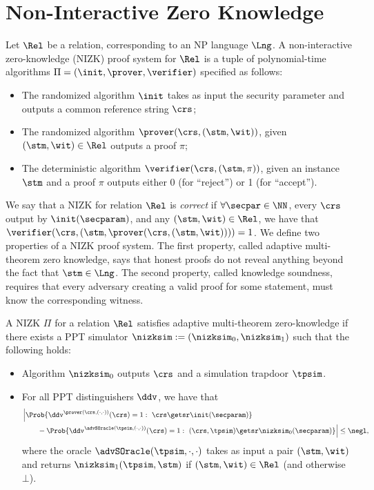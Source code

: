 \section{Non-Interactive Zero Knowledge}
Let $\Rel$ be a relation, corresponding to an NP language $\Lng$.
A non-interactive zero-knowledge (NIZK) proof system for $\Rel$
is a tuple of polynomial-time algorithms $\Pi = (\init, \prover, \verifier)$ specified as follows:
\begin{itemize}
    \item The randomized algorithm $\init$ takes as input the security parameter and outputs a common reference string $\crs$;
    \item The randomized algorithm $\prover(\crs,(\stm,\wit))$, given $(\stm,\wit) \in \Rel$ outputs a proof $\pi$;
    \item The deterministic algorithm $\verifier(\crs,(\stm,\pi))$, given an instance $\stm$ and a proof $\pi$ outputs either 0 (for ``reject'') or 1 (for ``accept'').
\end{itemize}
We say that a NIZK for relation $\Rel$ is {\em correct} if $\forall \secpar\in\NN$, every $\crs$ output by $\init(\secparam)$, and any $(\stm,\wit) \in \Rel$, we have that $\verifier(\crs,(\stm, \prover(\crs, (\stm,\wit))))=1$.
\newline\newline
We define two properties of a NIZK proof system.
The first property, called adaptive multi-theorem zero knowledge, says that honest proofs do not reveal anything beyond the fact that $\stm\in\Lng$.
The second property, called
knowledge soundness, requires that every adversary creating a valid proof for some statement, must know the corresponding witness.

\begin{definition}\label{def:nizk_zk}
    A NIZK $\Pi$ for a relation $\Rel$ satisfies adaptive multi-theorem zero-knowledge
    if there exists a PPT simulator $\nizksim := (\nizksim_0,\nizksim_1)$ such that the following holds:
    \begin{itemize}
        \item
              Algorithm $\nizksim_0$ outputs $\crs$ and a simulation trapdoor $\tpsim$.
        \item
              For all PPT distinguishers $\ddv$, we have that
              \begin{align*}
                   & \Big\lvert
                  \Prob{\ddv^{\prover(\crs,(\cdot,\cdot))}(\crs)=1:~\crs\getsr\init(\secparam)}                                 \\
                   & \qquad - \Prob{\ddv^{\advSOracle(\tpsim,(\cdot,\cdot))}(\crs)=1:~(\crs,\tpsim)\getsr\nizksim_0(\secparam)}
                  \Big\rvert \le \negl,
              \end{align*}
              where the oracle $\advSOracle(\tpsim,\cdot,\cdot)$ takes as input a pair $(\stm,\wit)$ and returns $\nizksim_1(\tpsim,\stm)$ if $(\stm,\wit)\in\Rel$ (and otherwise  $\bot$).
    \end{itemize}
\end{definition}


